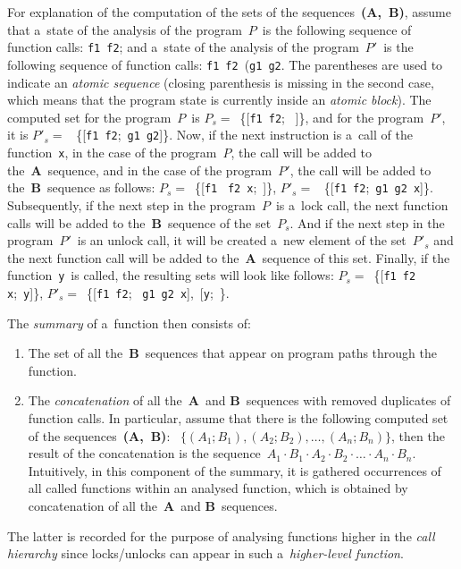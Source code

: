 \begin{example}
    For explanation of the computation of the sets of the 
    sequences~\textbf{(A,~B)}, assume that a~state of the analysis of 
    the program~$ P $~is the following sequence of function calls:
    \texttt{f1}~\texttt{f2}; and a~state of the analysis of the 
    program~$ P' $~is the following sequence of function calls:
    \texttt{f1}~\texttt{f2}~(\texttt{g1}~\texttt{g2}. The parentheses 
    are used to indicate an \emph{atomic sequence} (closing parenthesis is 
    missing in the second case, which means that the program state is 
    currently inside an \emph{atomic block}). The computed set for the
    program~$ P $~is $ P_s = $~\{[\texttt{f1}~\texttt{f2};~%
    \textvisiblespace]\}, and for the program~$ P' $, it is $ P'_s = $~%
    \{[\texttt{f1}~\texttt{f2};~\texttt{g1}~\texttt{g2}]\}. Now, if the next
    instruction is a~call of the function~\texttt{x}, in the case of the
    program~$ P $, the call will be added to the~\textbf{A}~sequence, and in 
    the case of the program~$ P' $, the call will be added to
    the~\textbf{B}~sequence as follows: $ P_s = $~\{[\texttt{f1}~%
    \texttt{f2}~\texttt{x};~\textvisiblespace]\}, $ P'_s = $~%
    \{[\texttt{f1}~\texttt{f2};~\texttt{g1}~\texttt{g2}~\texttt{x}]\}.
    Subsequently, if the next step in the program~$ P $~is a~lock call,
    the next function calls will be added to the~\textbf{B}~sequence of the
    set~$ P_s $. And if the next step in the program~$ P' $~is an unlock 
    call, it will be created a~new element of the set~$ P'_s $ and the
    next function call will be added to the~\textbf{A}~sequence of this set.
    Finally, if the function~\texttt{y}~is called, the resulting sets
    will look like follows: $ P_s = $~\{[\texttt{f1}~\texttt{f2}~%
    \texttt{x};~\texttt{y}]\}, $ P'_s = $~\{[\texttt{f1}~\texttt{f2};~%
    \texttt{g1}~\texttt{g2}~\texttt{x}],~[\texttt{y};~\textvisiblespace\}.
\end{example}

The \emph{summary} of a~function then consists of:
\begin{enumerate}[label={(\roman*)}]
    \item
        The set of all the~\textbf{B}~sequences that appear on program
        paths through the function.

    \item
        The \emph{concatenation} of all
        the~\textbf{A}~and \textbf{B}~sequences with removed duplicates 
        of function calls. In particular, assume that there is the
        following computed set of the sequences~\textbf{(A,~B)}:~%
        $ \{(A_1; B_1), (A_2; B_2), \ldots, (A_n; B_n)\} $, then
        the result of the concatenation is the sequence~$ A_1{\cdot}B_1%
        {\cdot}A_2{\cdot}B_2{\cdot} \ldots {\cdot}A_n{\cdot}B_n $.
        Intuitively, in this component of the summary, it is gathered
        occurrences of all called functions within an analysed function,
        which is obtained by concatenation of all
        the~\textbf{A}~and \textbf{B}~sequences.
\end{enumerate}
The latter is recorded for the purpose of analysing functions higher in the
\emph{call hierarchy} since locks/unlocks can appear in such
a~\emph{higher-level function}.

